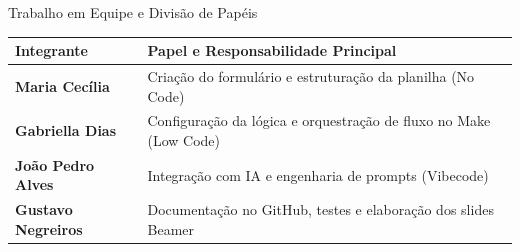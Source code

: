 \documentclass[aspectratio=169, 10pt]{beamer}
\begin{document}
\begin{frame}{Trabalho em Equipe e Divisão de Papéis}
    \begin{table}[h]
        \centering
        \small
        \begin{tabular}{ll}
            \toprule
            \textbf{Integrante} & \textbf{Papel e Responsabilidade Principal} \\
            \midrule
            \textbf{Maria Cecília} & Criação do formulário e estruturação da planilha (No Code) \\
            \textbf{Gabriella Dias} & Configuração da lógica e orquestração de fluxo no Make (Low Code) \\
            \textbf{João Pedro Alves} & Integração com IA e engenharia de prompts (Vibecode) \\
            \textbf{Gustavo Negreiros} & Documentação no GitHub, testes e elaboração dos slides Beamer \\
            \bottomrule
        \end{tabular}
    \end{table}
\end{frame}
\end{document}
